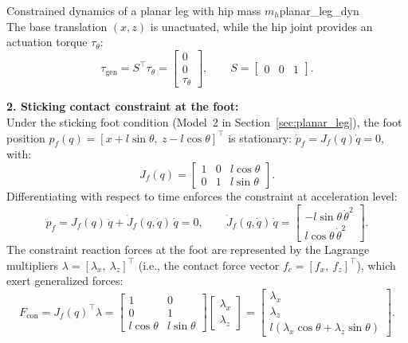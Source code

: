 \documentclass[11pt,a4paper]{article}
\begin{document}
\begin{example}{Constrained dynamics of a planar leg with hip mass $m_h$}{planar_leg_dyn}
\begin{equation}
\end{equation}
The base translation $(x,z)$ is unactuated, while the hip joint provides an actuation torque $\tau_\theta$:
\begin{equation}
  \tau_{\text{gen}} = S^\top \tau_\theta = \begin{bmatrix} 0 \\ 0 \\ \tau_\theta \end{bmatrix}, \qquad S = \begin{bmatrix} 0 & 0 & 1 \end{bmatrix}.
\end{equation}

\textbf{2. Sticking contact constraint at the foot:}\\
Under the sticking foot condition (Model~2 in Section~\ref{sec:planar_leg}), the foot position $p_f(q) = [x + l\sin\theta,\ z - l\cos\theta]^\top$ is stationary: $\dot p_f = J_f(q)\dot q = 0$, with:
\begin{equation}
  J_f(q) = \begin{bmatrix} 1 & 0 & l\cos\theta \\ 0 & 1 & l\sin\theta \end{bmatrix}.
\end{equation}
Differentiating with respect to time enforces the constraint at acceleration level:
\begin{equation}\label{eq:leg_acc_con}
  \ddot p_f = J_f(q)\,\ddot q + \dot J_f(q,\dot q)\,\dot q = 0, \qquad
  \dot J_f(q,\dot q)\,\dot q = \begin{bmatrix} -l\sin\theta\,\dot\theta^2 \\ l\cos\theta\,\dot\theta^2 \end{bmatrix}.
\end{equation}
The constraint reaction forces at the foot are represented by the Lagrange multipliers $\lambda = [\lambda_x,\ \lambda_z]^\top$ (i.e., the contact force vector $f_c = [f_x,\ f_z]^\top$), which exert generalized forces:
\begin{equation}
  F_{\mathrm{con}} = J_f(q)^\top \lambda = \begin{bmatrix} 1 & 0 \\ 0 & 1 \\ l\cos\theta & l\sin\theta \end{bmatrix} \begin{bmatrix} \lambda_x \\ \lambda_z \end{bmatrix} = \begin{bmatrix} \lambda_x \\ \lambda_z \\ l(\lambda_x\cos\theta + \lambda_z\sin\theta) \end{bmatrix}.
\end{equation}


\end{example}
\end{document}
